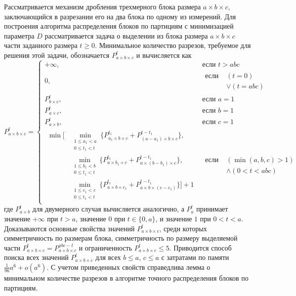 \documentclass[a4paper,14pt]{extarticle}                     %
\theoremstyle{plain}                                         %
\begin{document}
Рассматривается механизм дробления трехмерного блока размера $a \times b \times c$, заключающийся в разрезании его на два блока по одному из измерений.
Для построения алгоритма распределения блоков по партициям с минимизацией параметра $D$ рассматривается задача о выделении из блока размера $a \times b \times c$ части заданного размера $t \ge 0$.
Минимальное количество разрезов, требуемое для решения этой задачи, обозначается $P_{a \times b \times c}^t$ и вычисляется как
\begin{equation*}\label{eqn:par_pnmkt_3d}
P_{a \times b \times c}^t =
	\begin{cases}
		+\infty, & \text{если } t > abc \\
		0, & 
			\begin{aligned}
				\text{если } & (t = 0) \\[-4pt]
				& \vee (t = abc)
			\end{aligned} \\
		P_{b \times c}^t, & \text{если } a = 1 \\
		P_{a \times c}^t, & \text{если } b = 1 \\
		P_{a \times b}^t, & \text{если } c = 1 \\
		\begin{aligned}
			\min\big[
				& \min_{\substack{1 \le a_1 < a \\ 0 \le t_1 < t}}{\{P_{a_1 \times b \times c}^{t_1} + P_{(a - a_1) \times b \times c}^{t - t_1}\}}, \\[-2pt]
				& \min_{\substack{1 \le b_1 < b \\ 0 \le t_1 < t}}{\{P_{a \times b_1 \times c}^{t_1} + P_{a \times (b - b_1) \times c}^{t - t_1}\}}, \\[-2pt]
				& \min_{\substack{1 \le c_1 < c \\ 0 \le t_1 < t}}{\{P_{a \times b \times c_1}^{t_1} + P_{a \times b \times (c - c_1)}^{t - t_1}\}}
			\big] + 1
		\end{aligned} & 
			\begin{aligned}
				\text{если } & (\min(a, b, c) > 1) \\[-4pt]
				& \wedge (0 < t < abc)
			\end{aligned}
	\end{cases}
\end{equation*}
где $P_{a \times b}^t$ для двумерного случая вычисляется аналогично, а $P_a^t$ принимает значение $+\infty$ при $t > a$, значение $0$ при $t \in \{0, a\}$, и значение $1$ при $0 < t < a$.
Доказываются основные свойства значений $P_{a \times b \times c}^t$, среди которых симметричность по размерам блока, симметричность по размеру выделяемой части $P_{a \times b \times c}^t = P_{a \times b \times c}^{abc - t}$ и ограниченность $P_{a \times b \times c}^t \le 5$.
Приводится способ поиска всех значений $P_{a \times b \times c}^t$ для всех $b \le a$, $c \le a$ с затратами по памяти $\frac{1}{96}a^6 + o(a^6)$.
С учетом приведенных свойств справедлива лемма о минимальном количестве разрезов в алгоритме точного распределения блоков по партициям.
\end{document}
